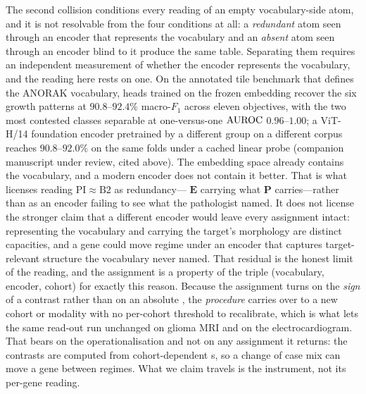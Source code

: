 The second collision conditions every reading of an empty vocabulary-side
atom, and it is not resolvable from the four conditions at all: a
\emph{redundant} atom seen through an encoder that represents the vocabulary
and an \emph{absent} atom seen through an encoder blind to it produce the same
table. Separating them requires an independent measurement of whether the
encoder represents the vocabulary, and the reading here rests on one. On the
annotated tile benchmark that defines the ANORAK
vocabulary\cite{anorak2024,ANORAKZenodo}, heads trained on the frozen
\ctranspath{} embedding recover the six growth patterns at $90.8$--$92.4\%$
macro-$F_1$ across eleven objectives, with the two most contested classes
separable at one-versus-one $\text{AUROC}$ $0.96$--$1.00$; a ViT-H/14 foundation
encoder pretrained by a different group on a different corpus reaches
$90.8$--$92.0\%$ on the same folds under a cached linear
probe (companion manuscript under review, cited above). The embedding space already contains the
vocabulary, and a modern encoder does not contain it better. That is what
licenses reading $\mathrm{PI}\!\approx\!\mathrm{B2}$ as redundancy---%
$\mathbf{E}$ carrying what $\mathbf{P}$ carries---rather than as an encoder
failing to see what the pathologist named. It does not license the stronger
claim that a different encoder would leave every assignment intact:
representing the vocabulary and carrying the target's morphology are distinct
capacities, and a gene could move regime under an encoder that captures
target-relevant structure the vocabulary never named. That residual is the
honest limit of the reading, and the assignment is a property of the triple
(vocabulary, encoder, cohort) for exactly this reason.
Because the assignment turns on the \emph{sign} of a contrast rather than
on an absolute \auroc{}, the \emph{procedure} carries over to a new
cohort or modality with no per-cohort threshold to recalibrate, which
is what lets the same read-out run unchanged on glioma MRI and on the
electrocardiogram. That bears on the operationalisation and not on any
assignment it returns: the contrasts are computed from cohort-dependent
\auroc{}s, so a change of case mix can move a gene between regimes.
What we claim travels is the instrument, not its per-gene reading.

